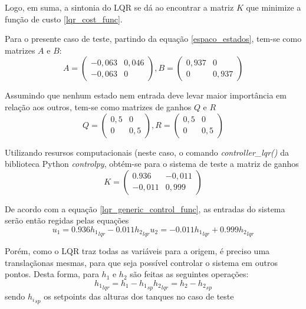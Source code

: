 Logo, em suma, a sintonia do LQR se dá ao encontrar a matriz $K$ que minimize a função de custo \ref{lqr_cost_func}.

Para o presente caso de teste, partindo da equação \ref{espaco_estados}, tem-se como matrizes $A$ e $B$:
\begin{equation}
A = \begin{pmatrix} -0,063 & 0,046 \\ -0,063 & 0 \end{pmatrix},
B = \begin{pmatrix} 0,937 & 0 \\ 0 & 0,937 \end{pmatrix}
\end{equation}

Assumindo que nenhum estado nem entrada deve levar maior importância em relação aos outros, tem-se como matrizes de ganhos $Q$ e $R$
\begin{equation}
Q = \begin{pmatrix} 0,5 & 0 \\ 0 & 0,5 \end{pmatrix},
R = \begin{pmatrix} 0,5 & 0 \\ 0 & 0,5 \end{pmatrix}
\end{equation}

Utilizando resursos computacionais (neste caso, o comando \emph{controller\_lqr()} da biblioteca Python \emph{controlpy}, obtém-se para o sistema de teste a matriz de ganhos
\begin{equation}
K = \begin{pmatrix} 0.936 & -0,011 \\ -0,011 & 0,999 \end{pmatrix}
\end{equation}

De acordo com a equação \ref{lqr_generic_control_func}, as entradas do sistema serão então regidas pelas equações
\begin{equation}
u_1 = 0.936 {h_1}_{lqr} - 0.011 {h_2}_{lqr}
u_2 = -0.011 {h_1}_{lqr} + 0.999 {h_2}_{lqr}
\label{lqr_control_function}
\end{equation}

Porém, como o LQR traz todas as variáveis para a origem, é preciso uma translaçãonas mesmas, para que seja possível controlar o sistema em outros pontos. Desta forma, para $h_1$ e $h_2$ são feitas as seguintes operações:
\begin{equation}
{h_1}_{lqr} = h_1 - {h_1}_{sp}
{h_2}_{lqr} = h_2 - {h_2}_{sp}
\label{lqr_translation}
\end{equation}
sendo ${h_i}_{sp}$ os setpoints das alturas dos tanques no caso de teste

